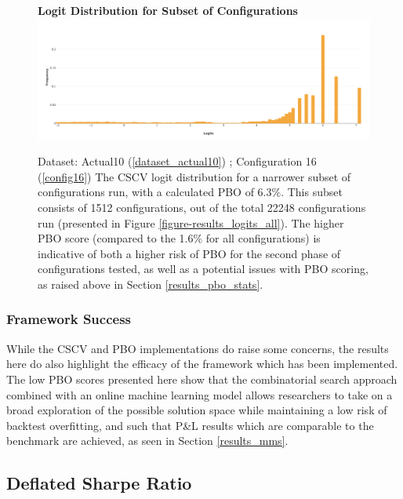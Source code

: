 \documentclass[a4paper,11pt,oneside]{article}
\theoremstyle{plain}
\theoremstyle{definition}
\begin{document}
	\begin{figure}[H]
		\centering 
		\textbf{Logit Distribution for Subset of Configurations}
		\includegraphics[scale=0.25]{images/results/pbo/subset_dist.png} 
		\caption[Logit Distribution for Subset of Configurations]{Dataset: Actual10 (\ref{dataset_actual10}) ; Configuration 16 (\ref{config16})
			\newline The CSCV logit distribution for a narrower subset of configurations run, with a calculated PBO of 6.3\%. This subset consists of 1512 configurations, out of the total 22248 configurations run (presented in Figure \ref{figure-results_logits_all}). The higher PBO score (compared to the 1.6\% for all configurations) is indicative of both a higher risk of PBO for the second phase of configurations tested, as well as a potential issues with PBO scoring, as raised above in Section \ref{results_pbo_stats}.}
		\label{figure-results_logits_subset}
	\end{figure}
	
	
	\subsubsection{Framework Success}
	
	
	While the CSCV and PBO implementations do raise some concerns, the results here do also highlight the efficacy of the framework which has been implemented. The low PBO scores presented here show that the combinatorial search approach combined with an online machine learning model allows researchers to take on a broad exploration of the possible solution space while maintaining a low risk of backtest overfitting, and such that P\&L results which are comparable to the benchmark are achieved, as seen in Section \ref{results_mms}.
	
	\newpage

	\subsection{Deflated Sharpe Ratio}\label{results_dsr}	
	
\end{document}
